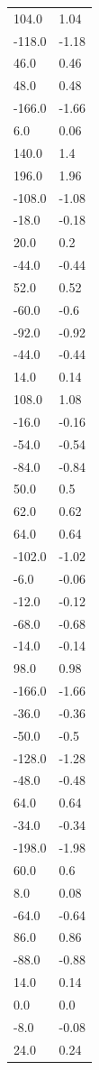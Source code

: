 \begin{longtable}{ll}
104.0 & 1.04 \\
-118.0 & -1.18 \\
46.0 & 0.46 \\
48.0 & 0.48 \\
-166.0 & -1.66 \\
6.0 & 0.06 \\
140.0 & 1.4 \\
196.0 & 1.96 \\
-108.0 & -1.08 \\
-18.0 & -0.18 \\
20.0 & 0.2 \\
-44.0 & -0.44 \\
52.0 & 0.52 \\
-60.0 & -0.6 \\
-92.0 & -0.92 \\
-44.0 & -0.44 \\
14.0 & 0.14 \\
108.0 & 1.08 \\
-16.0 & -0.16 \\
-54.0 & -0.54 \\
-84.0 & -0.84 \\
50.0 & 0.5 \\
62.0 & 0.62 \\
64.0 & 0.64 \\
-102.0 & -1.02 \\
-6.0 & -0.06 \\
-12.0 & -0.12 \\
-68.0 & -0.68 \\
-14.0 & -0.14 \\
98.0 & 0.98 \\
-166.0 & -1.66 \\
-36.0 & -0.36 \\
-50.0 & -0.5 \\
-128.0 & -1.28 \\
-48.0 & -0.48 \\
64.0 & 0.64 \\
-34.0 & -0.34 \\
-198.0 & -1.98 \\
60.0 & 0.6 \\
8.0 & 0.08 \\
-64.0 & -0.64 \\
86.0 & 0.86 \\
-88.0 & -0.88 \\
14.0 & 0.14 \\
0.0 & 0.0 \\
-8.0 & -0.08 \\
24.0 & 0.24 \\

\end{longtable}
